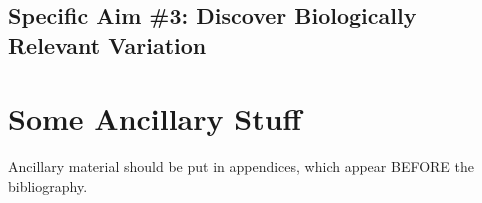 \documentclass[11pt,proposal]{ucthesis}
\begin{document}


\section{Specific Aim \#3: Discover Biologically Relevant Variation}




\appendix
\chapter{Some Ancillary Stuff}

Ancillary material should be put in appendices, which appear BEFORE the
bibliography. 


\nocite{*}

\def\baselinestretch{1.0}\large\normalsize



\end{document}
